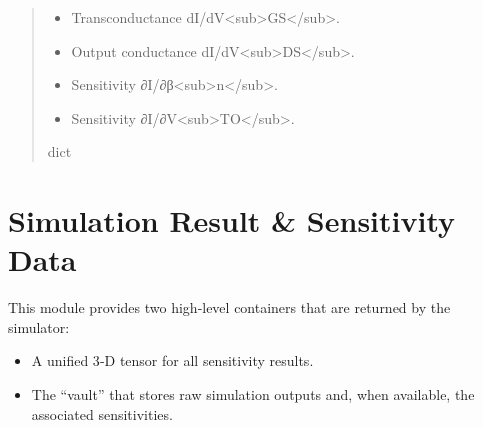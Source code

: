 \documentclass[letterpaper,10pt,english]{sphinxmanual}
\begin{document}
\begin{fulllineitems}
\begin{quote}
\begin{description}
\begin{itemize}
\item {} 
\sphinxAtStartPar
{}    \textendash{} Transconductance dI/dV\textless{}sub\textgreater{}GS\textless{}/sub\textgreater{}.

\item {} 
\sphinxAtStartPar
{}   \textendash{} Output conductance dI/dV\textless{}sub\textgreater{}DS\textless{}/sub\textgreater{}.

\item {} 
\sphinxAtStartPar
{}
\textendash{} Sensitivity ∂I/∂β\textless{}sub\textgreater{}n\textless{}/sub\textgreater{}.

\item {} 
\sphinxAtStartPar
{}
\textendash{} Sensitivity ∂I/∂V\textless{}sub\textgreater{}TO\textless{}/sub\textgreater{}.

\end{itemize}


\sphinxAtStartPar
dict

\end{description}\end{quote}

\end{fulllineitems}


\sphinxstepscope


\chapter{Simulation Result \& Sensitivity Data}
\label{\detokenize{results:simulation-result-sensitivity-data}}\label{\detokenize{results:results-module}}\label{\detokenize{results::doc}}
\sphinxAtStartPar
This module provides two high‑level containers that are returned by the simulator:
{\color{red}\bfseries{}\textasciigrave{}\textasciigrave{}}{\color{red}\bfseries{}\textasciigrave{}}
\begin{itemize}
\item {} 
\sphinxAtStartPar
{\hyperref[\detokenize{results:SensitivityData}]{}} \textendash{} A unified 3‑D tensor for all sensitivity results.

\item {} 
\sphinxAtStartPar
{\hyperref[\detokenize{results:SimulationResult}]{}} \textendash{} The “vault” that stores raw simulation outputs and, when available, the associated sensitivities.

\end{itemize}
\end{document}
